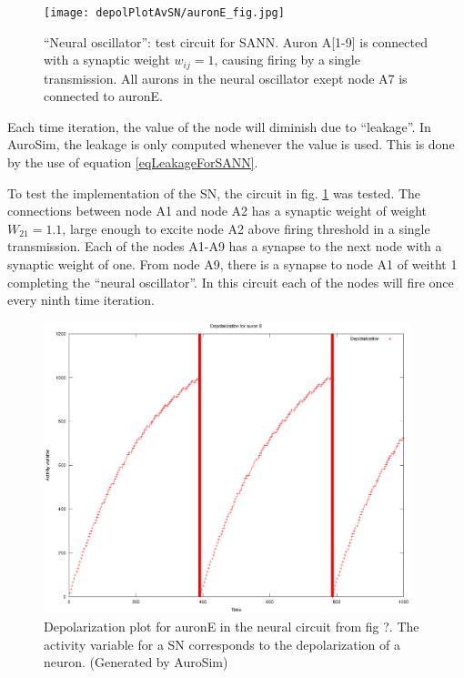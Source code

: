 	\begin{figure}[hb!tp]
		\centering 		
		\texttt{[image: depolPlotAvSN/auronE\_fig.jpg]}
		\caption{``Neural oscillator'': test circuit for SANN. Auron A[1-9] is connected with a synaptic weight $w_{ij}=1$, causing firing by a single transmission. 
		All aurons in the neural oscillator exept node A7 is connected to auronE.
		}
		\label{figAuronE_schematics}
	\end{figure}

	Each time iteration, the value of the node will diminish due to ``leakage''. 
	In AuroSim, the leakage is only computed whenever the value is used.
	This is done by the use of equation \eqref{eqLeakageForSANN}.

	To test the implementation of the SN, the circuit in fig. \ref{figAuronE_schematics}
		was tested. The connections between node A1 and node A2 has a synaptic weight of weight $W_{21}=1.1$, large enough to excite node A2 above firing threshold in a single transmission.
	Each of the nodes A1-A9 has a synapse to the next node with a synaptic weight of one. 
	From node A9, there is a synapse to node A1 of weitht 1 completing the ``neural oscillator''. In this circuit each of the nodes will fire once every ninth time iteration.

	\begin{figure}[hb!tp]
		\centering 				%
		\includegraphics[width=0.95\textwidth]{depolPlotAvSN/eps_auronE-depol}
		\caption{Depolarization plot for auronE in the neural circuit from fig ?. The activity variable for a SN corresponds to the depolarization of a neuron.
		(Generated by AuroSim)} %
		\label{figAuronE}
	\end{figure}

